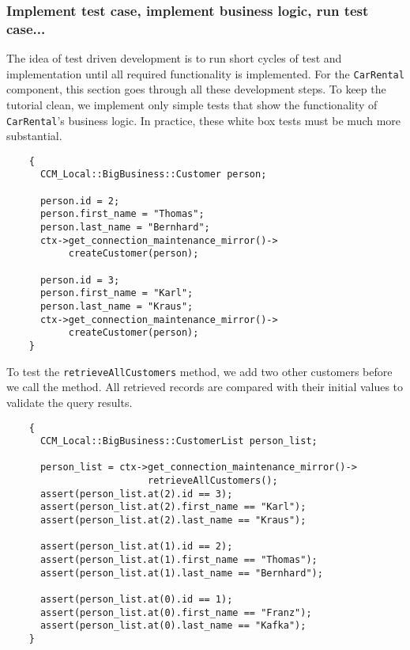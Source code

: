 \subsubsection{Implement test case, implement business logic, run test case...}

The idea of test driven development is to run short cycles of test and
implementation until all required functionality is implemented.
For the {\tt CarRental} component, this section goes through all these 
development steps. 
To keep the tutorial clean, we implement only simple tests that show the
functionality of {\tt CarRental}'s business logic.
In practice, these white box tests must be much more substantial.

\begin{small}
\begin{verbatim}
    {
      CCM_Local::BigBusiness::Customer person;

      person.id = 2;
      person.first_name = "Thomas";
      person.last_name = "Bernhard";
      ctx->get_connection_maintenance_mirror()->
           createCustomer(person);

      person.id = 3;
      person.first_name = "Karl";
      person.last_name = "Kraus";
      ctx->get_connection_maintenance_mirror()->
           createCustomer(person);
    }
\end{verbatim}
\end{small}

To test the {\tt retrieveAllCustomers} method, we add two other customers before
we call the method. All retrieved records are compared with their initial values
to validate the query results. 

\begin{small}
\begin{verbatim}
    {
      CCM_Local::BigBusiness::CustomerList person_list;

      person_list = ctx->get_connection_maintenance_mirror()->
                         retrieveAllCustomers();
      assert(person_list.at(2).id == 3);
      assert(person_list.at(2).first_name == "Karl");
      assert(person_list.at(2).last_name == "Kraus");

      assert(person_list.at(1).id == 2);
      assert(person_list.at(1).first_name == "Thomas");
      assert(person_list.at(1).last_name == "Bernhard");

      assert(person_list.at(0).id == 1);
      assert(person_list.at(0).first_name == "Franz");
      assert(person_list.at(0).last_name == "Kafka");
    }      
\end{verbatim}
\end{small}

